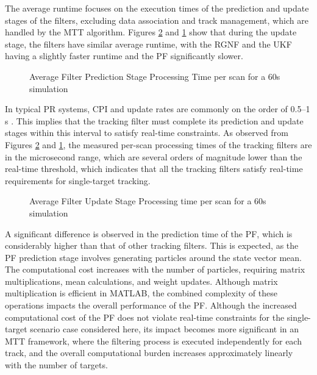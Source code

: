 The average runtime focuses on the execution times of the prediction and update stages of the filters, excluding data association and track management, which are handled by the \ac{MTT} algorithm. Figures \ref{fig:timeUpdate} and \ref{fig:timePrediction} show that during the update stage, the filters have similar average runtime, with the \ac{RGNF} and the \ac{UKF} having a slightly faster runtime and the \ac{PF} significantly slower.
\newline
\begin{figure}[H]
    \centering
    
    \caption{Average Filter Prediction Stage Processing Time per scan for a 60s simulation}
    \label{fig:timePrediction}
\end{figure}
In typical \ac{PR} systems, \ac{CPI} and update rates are commonly on the order of 0.5–1 s \cite{coloneECA}. This implies that the tracking filter must complete its prediction and update stages within this interval to satisfy real-time constraints. As observed from Figures \ref{fig:timeUpdate} and \ref{fig:timePrediction}, the measured per-scan processing times of the tracking filters are in the microsecond range, which are several orders of magnitude lower than the real-time threshold, which indicates that all the tracking filters satisfy real-time requirements for single-target tracking.
\newline
\begin{figure}[H]
    \centering
    
    \caption{Average Filter Update Stage Processing time per scan for a 60s simulation}
    \label{fig:timeUpdate}
\end{figure}
A significant difference is observed in the prediction time of the \ac{PF}, which is considerably higher than that of other tracking filters. This is expected, as the \ac{PF} prediction stage involves generating particles around the state vector mean. The computational cost increases with the number of particles, requiring matrix multiplications, mean calculations, and weight updates. Although matrix multiplication is efficient in MATLAB, the combined complexity of these operations impacts the overall performance of the \ac{PF}. Although the increased computational cost of the \ac{PF} does not violate real-time constraints for the single-target scenario case considered here, its impact becomes more significant in an \ac{MTT} framework, where the filtering process is executed independently for each track, and the overall computational burden increases approximately linearly with the number of targets.



